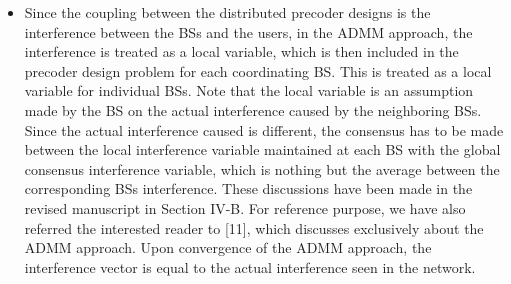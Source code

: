 \begin{enumerate}
\begin{itemize}
\item Since the coupling between the distributed precoder designs is the interference between the BSs and the users, in the \ac{ADMM} approach, the interference is treated as a local variable, which is then included in the precoder design problem for each coordinating BS. This is treated as a local variable for individual \acp{BS}. Note that the local variable is an assumption made by the BS on the actual interference caused by the neighboring BSs. Since the actual interference caused is different, the consensus has to be made between the local interference variable maintained at each BS with the global consensus interference variable, which is nothing but the average between the corresponding BSs interference. These discussions have been made in the revised manuscript in Section IV-B. For reference purpose, we have also referred the interested reader to [11], which discusses exclusively about the ADMM approach. Upon convergence of the \ac{ADMM} approach, the interference vector is equal to the actual interference seen in the network.
\end{itemize}

\end{enumerate}



